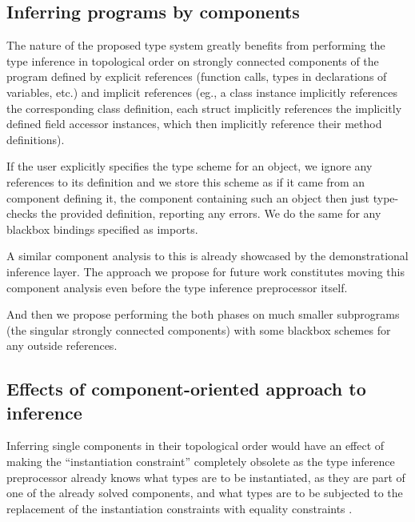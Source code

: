 \subsection{Inferring programs by components}

The nature of the proposed type system greatly benefits from performing the type inference in topological order on strongly connected components of the program defined by explicit references (function calls, types in declarations of variables, etc.) and implicit references (eg., a class instance implicitly references the corresponding class definition, each struct implicitly references the implicitly defined field accessor instances, which then implicitly reference their method definitions).

\begin{remark}
    If the user explicitly specifies the type scheme for an object, we ignore any references to its definition and we store this scheme as if it came from an component defining it, the component containing such an object then just type-checks the provided definition, reporting any errors. We do the same for any blackbox bindings specified as imports.
\end{remark}

A similar component analysis to this is already showcased by the demonstrational inference layer. The approach we propose for future work constitutes moving this component analysis even before the type inference preprocessor itself.

And then we propose performing the both phases on much smaller subprograms (the singular strongly connected components) with some blackbox schemes for any outside references. 

\subsection{Effects of component-oriented approach to inference}

Inferring single components in their topological order would have an effect of making the ``instantiation constraint'' completely obsolete as the type inference preprocessor already knows what types are to be instantiated, as they are part of one of the already solved components, and what types are to be subjected to the replacement of the instantiation constraints with equality constraints .

